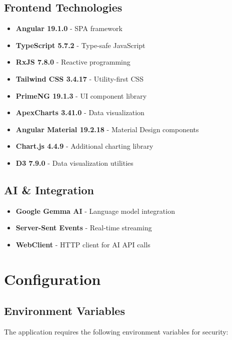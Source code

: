 \documentclass[11pt,a4paper]{article}
\begin{document}
\subsection{Frontend Technologies}
\begin{itemize}[leftmargin=*]
    \item \textbf{Angular 19.1.0} - SPA framework
    \item \textbf{TypeScript 5.7.2} - Type-safe JavaScript
    \item \textbf{RxJS 7.8.0} - Reactive programming
    \item \textbf{Tailwind CSS 3.4.17} - Utility-first CSS
    \item \textbf{PrimeNG 19.1.3} - UI component library
    \item \textbf{ApexCharts 3.41.0} - Data visualization
    \item \textbf{Angular Material 19.2.18} - Material Design components
    \item \textbf{Chart.js 4.4.9} - Additional charting library
    \item \textbf{D3 7.9.0} - Data visualization utilities
\end{itemize}

\subsection{AI \& Integration}
\begin{itemize}[leftmargin=*]
    \item \textbf{Google Gemma AI} - Language model integration
    \item \textbf{Server-Sent Events} - Real-time streaming
    \item \textbf{WebClient} - HTTP client for AI API calls
\end{itemize}

\newpage

\section{Configuration}

\subsection{Environment Variables}

The application requires the following environment variables for security:
\end{document}
